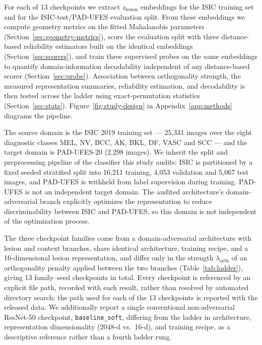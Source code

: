 For each of 13 checkpoints we extract $z_{\mathrm{lesion}}$ embeddings for the ISIC training set and for the ISIC-test/PAD-UFES evaluation split. From these embeddings we compute geometry metrics on the fitted Mahalanobis parameters (Section~\ref{sec:geometry-metrics}), score the evaluation split with three distance-based reliability estimators built on the identical embeddings (Section~\ref{sec:scorers}), and train three supervised probes on the same embeddings to quantify domain-information decodability independent of any distance-based scorer (Section~\ref{sec:probe}). Association between orthogonality strength, the measured representation summaries, reliability estimation, and decodability is then tested across the ladder using exact-permutation statistics (Section~\ref{sec:stats}). Figure~\ref{fig:study-design} in Appendix~\ref{app:methods} diagrams the pipeline.

The source domain is the ISIC 2019 training set \citep{codella2019skin, tschandl2018ham10000, combalia2019bcn20000} --- 25{,}331 images over the eight diagnostic classes MEL, NV, BCC, AK, BKL, DF, VASC and SCC --- and the target domain is PAD-UFES-20 \citep{pacheco2020padufes20} (2{,}298 images). We inherit the split and preprocessing pipeline of the classifier this study audits: ISIC is partitioned by a fixed seeded stratified split into 16{,}211 training, 4{,}053 validation and 5{,}067 test images, and PAD-UFES is withheld from label supervision during training. PAD-UFES is not an independent target domain. The audited architecture's domain-adversarial branch explicitly optimizes the representation to reduce discriminability between ISIC and PAD-UFES, so this domain is not independent of the optimization process.

The three checkpoint families come from a domain-adversarial architecture with lesion and context branches, share identical architecture, training recipe, and a 16-dimensional lesion representation, and differ only in the strength $\lambda_{\mathrm{orth}}$ of an orthogonality penalty applied between the two branches (Table~\ref{tab:ladder}), giving 13 family--seed checkpoints in total. Every checkpoint is referenced by an explicit file path, recorded with each result, rather than resolved by automated directory search; the path used for each of the 13 checkpoints is reported with the released data. We additionally report a single conventional non-adversarial ResNet-50 checkpoint, \texttt{baseline\_soft}, differing from the ladder in architecture, representation dimensionality (2048-d vs.\ 16-d), and training recipe, as a descriptive reference rather than a fourth ladder rung.

